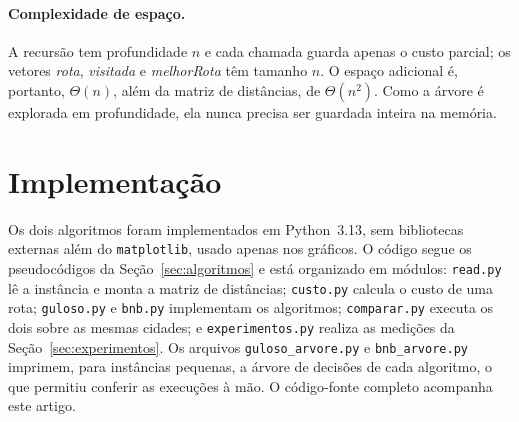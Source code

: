 \documentclass[12pt,a4paper]{article}
\newcommand{\algvar}[1]{\textit{#1}}
\begin{document}
\paragraph{Complexidade de espaço.} A recursão tem profundidade $n$ e cada chamada guarda apenas o custo parcial; os vetores \algvar{rota}, \algvar{visitada} e \algvar{melhorRota} têm tamanho $n$. O espaço adicional é, portanto, $\Theta(n)$, além da matriz de distâncias, de $\Theta(n^2)$. Como a árvore é explorada em profundidade, ela nunca precisa ser guardada inteira na memória.

\section{Implementação}\label{sec:implementacao}

Os dois algoritmos foram implementados em Python~3.13, sem bibliotecas externas além do \texttt{matplotlib}, usado apenas nos gráficos. O código segue os pseudocódigos da Seção~\ref{sec:algoritmos} e está organizado em módulos: \texttt{read.py} lê a instância e monta a matriz de distâncias; \texttt{custo.py} calcula o custo de uma rota; \texttt{guloso.py} e \texttt{bnb.py} implementam os algoritmos; \texttt{comparar.py} executa os dois sobre as mesmas cidades; e \texttt{experimentos.py} realiza as medições da Seção~\ref{sec:experimentos}. Os arquivos \texttt{guloso\_arvore.py} e \texttt{bnb\_arvore.py} imprimem, para instâncias pequenas, a árvore de decisões de cada algoritmo, o que permitiu conferir as execuções à mão. O código-fonte completo acompanha este artigo.
\end{document}

